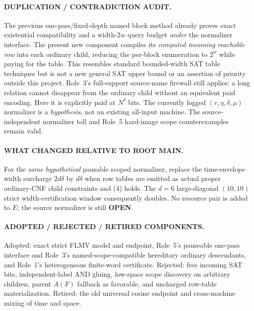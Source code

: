 \documentclass[11pt]{article}
\newcommand{\OPEN}{\textbf{OPEN}}
\begin{document}
\paragraph{DUPLICATION / CONTRADICTION AUDIT.}
The previous one-pass/fixed-depth named block method already proves
exact existential compatibility and a width-$2w$ query budget
\emph{under} the normalizer interface.  The present new component
compiles its \emph{computed incoming reachable row} into each ordinary
child, reducing the per-block enumeration to $2^w$ while paying
for the table.  This resembles standard bounded-width SAT table
techniques but is not a new general SAT upper bound or an assertion
of priority outside this project.  Role~3's full-support source-name
firewall still applies: a long relation cannot disappear from the
ordinary child without an equivalent paid encoding. Here it is
explicitly paid at $N^\delta$ bits. The currently logged
$(r,\eta,\delta,\mu)$ normalizer is a \emph{hypothesis}, not an
existing all-input machine.  The source-independent normalizer toll
and Role~5 hard-image scope counterexamples remain valid.

\paragraph{WHAT CHANGED RELATIVE TO ROOT MAIN.}
For the \emph{same hypothetical} pausable scoped normalizer, replace
the time-envelope width surcharge $2d\delta$ by $d\delta$
when row tables are emitted as actual proper ordinary-CNF child
constraints and (4) holds.  The $d=6$ large-diagonal
$(10,10)$ strict width-certification window consequently doubles.  No resource pair is added to
$E$; the source normalizer is still \OPEN{}.

\paragraph{ADOPTED / REJECTED / RETIRED COMPONENTS.}
Adopted: exact strict FLMV model and endpoint, Role~5's pauseable
one-pass interface and Role~3's named-scope-compatible hereditary
ordinary descendants, and Role~1's heterogeneous finite-word
certificate.  Rejected: free incoming SAT bits, independent-label
AND gluing, low-space scope discovery on arbitrary children, parent
$A(F)$ fallback as favorable, and uncharged row-table materialization.
Retired: the old universal cosine endpoint and cross-machine
mixing of time and space.
\end{document}
